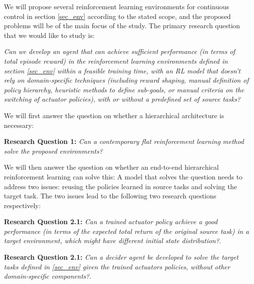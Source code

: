 We will propose several reinforcement learning environments for continuous control in section \ref{sec_env} according to the stated scope, and the proposed problems will be of the main focus of the study.
The primary research question that we would like to study is:

    \textit{Can we develop an agent that can achieve sufficient performance (in terms of total episode reward) in the reinforcement learning environments defined in section \ref{sec_env} within a feasible training time, with an RL model that doesn't rely on domain-specific techniques  (including reward shaping, manual definition of policy hierarchy, heuristic methods to define sub-goals, or manual criteria on the switching of actuator policies), with or without a predefined set of source tasks?}


We will first answer the question on whether a hierarchical architecture is necessary: 

\textbf{Research Question 1: }\textit{Can a contemporary flat reinforcement learning method solve the proposed environments?}


We will then answer the question on whether an end-to-end hierarchical reinforcement learning can solve this:
A model that solves the question needs to address two issues: reusing the policies learned in source tasks and solving the target task. The two issues lead to the following two research questions respectively:

\textbf{Research Question 2.1: }\textit{Can a trained actuator policy achieve a good performance (in terms of the expected total return of the original source task) in a target environment, which might have different initial state distribution?}.

\textbf{Research Question 2.1: }\textit{Can a decider agent be developed to solve the target tasks defined in \ref{sec_env} given the trained actuators policies, without other domain-specific components?}.
